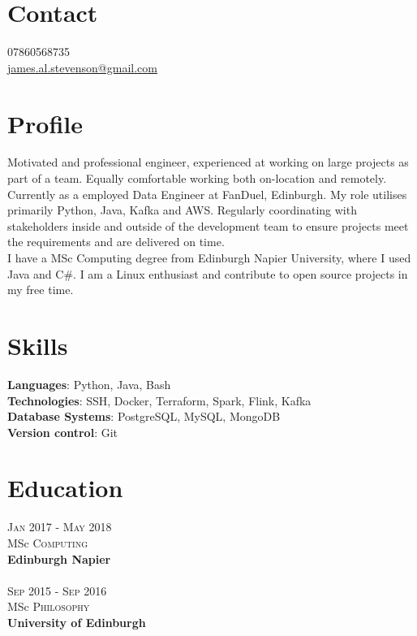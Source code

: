 \documentclass[14pt, a4paper]{extarticle}
\begin{document}
\par{\bigskip\par
\section{Contact}
\large
07860568735\\
\href{mailto:james.al.stevenson@gmail.com}{james.al.stevenson@gmail.com}\\
}

\begin{multicols}{2}

\section{Profile}
\noindent Motivated and professional engineer, experienced at working on large projects as part of a team. Equally comfortable working both on-location and remotely.\\
Currently as a employed Data Engineer at FanDuel, Edinburgh. My role utilises primarily Python, Java, Kafka and AWS. Regularly coordinating with stakeholders inside and outside of the development team to ensure projects meet the requirements and are delivered on time.\\
I have a MSc Computing degree from Edinburgh Napier University, where I used Java and C\#. I am a Linux enthusiast and contribute to open source projects in my free time.

\section{Skills}
\noindent\textbf{Languages}: Python, Java, Bash\\
\textbf{Technologies}: SSH, Docker, Terraform, Spark, Flink, Kafka\\
\textbf{Database Systems}: PostgreSQL, MySQL, MongoDB\\
\textbf{Version control}: Git\\

\section{Education}
\noindent\textsc{Jan} 2017 - \textsc{May} 2018\\
MSc \textsc{Computing} \\
\textbf{Edinburgh Napier}\\~\\
\textsc{Sep} 2015 - \textsc{Sep} 2016\\
MSc \textsc{Philosophy} \\
\textbf{University of Edinburgh}


\end{multicols}
\end{document}
